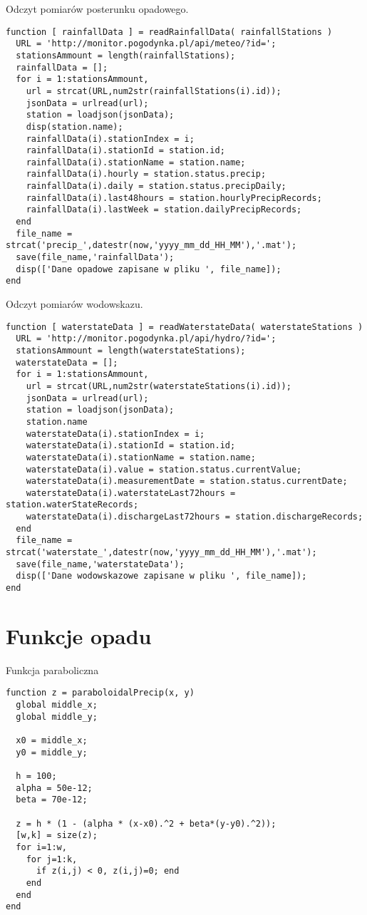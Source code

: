 Odczyt pomiarów posterunku opadowego.
\begin{lstlisting}
function [ rainfallData ] = readRainfallData( rainfallStations )
  URL = 'http://monitor.pogodynka.pl/api/meteo/?id=';
  stationsAmmount = length(rainfallStations); 
  rainfallData = [];
  for i = 1:stationsAmmount,
    url = strcat(URL,num2str(rainfallStations(i).id));
    jsonData = urlread(url);
    station = loadjson(jsonData);
    disp(station.name);
    rainfallData(i).stationIndex = i;
    rainfallData(i).stationId = station.id;
    rainfallData(i).stationName = station.name; 
    rainfallData(i).hourly = station.status.precip;
    rainfallData(i).daily = station.status.precipDaily;
    rainfallData(i).last48hours = station.hourlyPrecipRecords;
    rainfallData(i).lastWeek = station.dailyPrecipRecords;
  end  
  file_name = strcat('precip_',datestr(now,'yyyy_mm_dd_HH_MM'),'.mat');
  save(file_name,'rainfallData');
  disp(['Dane opadowe zapisane w pliku ', file_name]);
end
\end{lstlisting}


Odczyt pomiarów wodowskazu.
\begin{lstlisting}
function [ waterstateData ] = readWaterstateData( waterstateStations )
  URL = 'http://monitor.pogodynka.pl/api/hydro/?id=';
  stationsAmmount = length(waterstateStations);
  waterstateData = [];
  for i = 1:stationsAmmount,
    url = strcat(URL,num2str(waterstateStations(i).id));
    jsonData = urlread(url);
    station = loadjson(jsonData);
    station.name
    waterstateData(i).stationIndex = i;
    waterstateData(i).stationId = station.id;
    waterstateData(i).stationName = station.name;
    waterstateData(i).value = station.status.currentValue;
    waterstateData(i).measurementDate = station.status.currentDate;
    waterstateData(i).waterstateLast72hours = station.waterStateRecords;
    waterstateData(i).dischargeLast72hours = station.dischargeRecords;
  end
  file_name = strcat('waterstate_',datestr(now,'yyyy_mm_dd_HH_MM'),'.mat');
  save(file_name,'waterstateData');
  disp(['Dane wodowskazowe zapisane w pliku ', file_name]);
end
\end{lstlisting}



\section{Funkcje opadu}
Funkcja paraboliczna
\begin{lstlisting}
function z = paraboloidalPrecip(x, y)
  global middle_x;
  global middle_y;

  x0 = middle_x;
  y0 = middle_y;

  h = 100;
  alpha = 50e-12; 
  beta = 70e-12;

  z = h * (1 - (alpha * (x-x0).^2 + beta*(y-y0).^2));
  [w,k] = size(z);
  for i=1:w,
    for j=1:k,
      if z(i,j) < 0, z(i,j)=0; end
    end
  end
end
\end{lstlisting}


